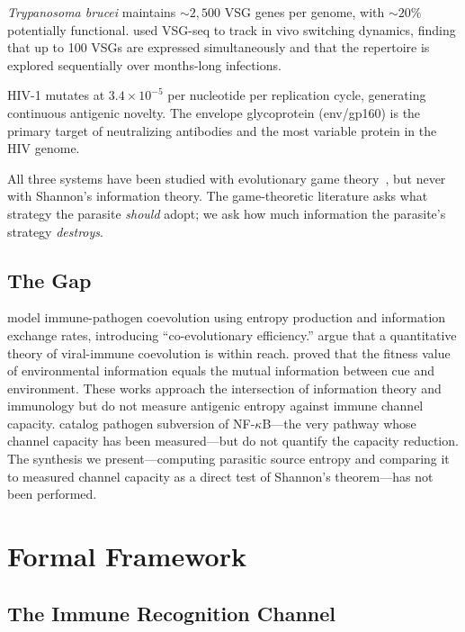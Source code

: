 \documentclass[twocolumn,10pt]{article}
\begin{document}
\textit{Trypanosoma brucei} maintains ${\sim}2{,}500$ VSG genes per genome, with ${\sim}20\%$ potentially functional.  \citet{mugnier2015} used VSG-seq to track in vivo switching dynamics, finding that up to 100 VSGs are expressed simultaneously and that the repertoire is explored sequentially over months-long infections.

HIV-1 mutates at $3.4 \times 10^{-5}$ per nucleotide per replication cycle, generating continuous antigenic novelty.  The envelope glycoprotein (env/gp160) is the primary target of neutralizing antibodies and the most variable protein in the HIV genome.

All three systems have been studied with evolutionary game theory~\citep{bremermann1983,nowak1994,frank1996}, but never with Shannon's information theory.  The game-theoretic literature asks what strategy the parasite \emph{should} adopt; we ask how much information the parasite's strategy \emph{destroys}.

\subsection{The Gap}

\citet{bellamy2024} model immune-pathogen coevolution using entropy production and information exchange rates, introducing ``co-evolutionary efficiency.''  \citet{mora2023} argue that a quantitative theory of viral-immune coevolution is within reach.  \citet{bergstrom2005} proved that the fitness value of environmental information equals the mutual information between cue and environment.  These works approach the intersection of information theory and immunology but do not measure antigenic entropy against immune channel capacity.  \citet{rahman2011} catalog pathogen subversion of NF-$\kappa$B---the very pathway whose channel capacity has been measured---but do not quantify the capacity reduction.  The synthesis we present---computing parasitic source entropy and comparing it to measured channel capacity as a direct test of Shannon's theorem---has not been performed.

\section{Formal Framework}
\label{sec:framework}

\subsection{The Immune Recognition Channel}
\end{document}
